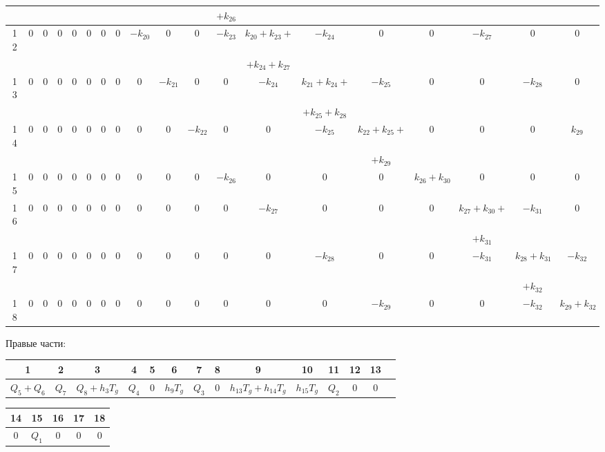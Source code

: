 \documentclass[a4paper, 12pt]{article}
\begin{document}
\begin{landscape}
\begin{table}[h]
\begin{tabular}{|c|c|c|c|c|c|c|c|c|c|c|c|c|c|c|c|c|c|c|}
        &&&&&&&&&&& $+ k_{26} $&&&&&&\\
        \midrule
        12&0&0&0&0&0&0&0&$-k_{20}$&0&0&$-k_{23}$& $k_{20} + k_{23} + $ &$-k_{24}$&0&0&$-k_{27}$&0&0\\ 
        &&&&&&&&&&&& $+ k_{24} + k_{27} $&&&&&\\
                \midrule
        13&0&0&0&0&0&0&0&0&$-k_{21}$&0&0&$-k_{24}$& $k_{21} + k_{24} + $ &$-k_{25}$&0&0&$-k_{28}$&0\\ 
        &&&&&&&&&&&&& $+ k_{25} + k_{28}$&&&&\\
        \midrule
        14 & 0&0&0&0&0&0&0&0&0&$-k_{22}$&0&0&$-k_{25}$& $k_{22} + k_{25} + $ &0&0&0&$k_{29}$\\ 
        &&&&&&&&&&&&&& $+ k_{29}$&&&\\
        \midrule
        15 & 0&0&0&0&0&0&0&0&0&0&$-k_{26}$&0&0&0& $k_{26} + k_{30} $ &0&0&0\\ 
        \midrule
        16 & 0&0&0&0&0&0&0&0&0&0&0&$-k_{27}$&0&0&0& $k_{27} + k_{30} + $ &$-k_{31}$&0\\ 
        &&&&&&&&&&&&&&&& $+ k_{31}$&\\
        \midrule
        17 & 0&0&0&0&0&0&0&0&0&0&0&0&$-k_{28}$&0&0&$-k_{31}$& $k_{28} + k_{31} $ &$-k_{32}$\\ 
        &&&&&&&&&&&&&&&&& $+ k_{32}$\\
        \midrule
        18 & 0&0&0&0&0&0&0&0&0&0&0&0&0&$-k_{29}$&0&0&$-k_{32}$& $k_{29} + k_{32}$\\ 
               \bottomrule
    \end{tabular}
\end{table}

\end{landscape}

\newpage
Правые части:
\begin{table}[h]
    \centering
    \begin{tabular}{|c|c|c|c|c|c|c|c|c|c|c|c|c|c|}
        \toprule
        1&2&3&4&5&6&7&8&9&10&11&12&13\\ 
        \midrule
        $Q_5 + Q_6$& $Q_7$ & $Q_8 + h_3 T_g$ & $Q_4$& 0 & $h_9 T_g$ & $Q_3$ &0 & $h_{13} T_g + h_{14} T_g$ & $h_{15} T_g$ & $Q_2$ & 0 &0\\ 
  \bottomrule
    \end{tabular}
\end{table}
\begin{table}[h]
    \centering
    \begin{tabular}{|c|c|c|c|c|}
        \toprule
        14&15&16&17&18\\ 
        \midrule
        0 & $Q_1$ &0 &0 &0\\ 
  \bottomrule
    \end{tabular}
\end{table}
\end{document}
